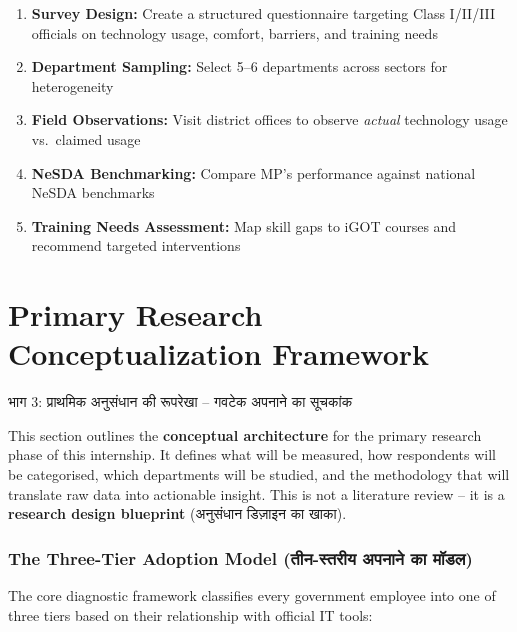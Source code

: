 \documentclass[12pt,a4paper]{article}
\newcommand{\hindi}[1]{{\hindifont #1}}
\begin{document}
\begin{enumerate}
  \item \textbf{Survey Design:} Create a structured questionnaire targeting Class I/II/III officials on technology usage, comfort, barriers, and training needs
  \item \textbf{Department Sampling:} Select 5--6 departments across sectors for heterogeneity
  \item \textbf{Field Observations:} Visit district offices to observe \textit{actual} technology usage vs.\ claimed usage
  \item \textbf{NeSDA Benchmarking:} Compare MP's performance against national NeSDA benchmarks
  \item \textbf{Training Needs Assessment:} Map skill gaps to iGOT courses and recommend targeted interventions
\end{enumerate}

\newpage
\part{Primary Research Conceptualization Framework}
\begin{center}{\Large\hindi{भाग 3: प्राथमिक अनुसंधान की रूपरेखा -- गवटेक अपनाने का सूचकांक}}\end{center}

\begin{notebox}
This section outlines the {\bfseries conceptual architecture} for the primary research phase of this internship. It defines what will be measured, how respondents will be categorised, which departments will be studied, and the methodology that will translate raw data into actionable insight. This is not a literature review -- it is a {\bfseries research design blueprint} ({\hindi{अनुसंधान डिज़ाइन का खाका}}).
\end{notebox}

\section{The Three-Tier Adoption Model (\hindi{तीन-स्तरीय अपनाने का मॉडल})}

The core diagnostic framework classifies every government employee into one of three tiers based on their relationship with official IT tools:
\end{document}
